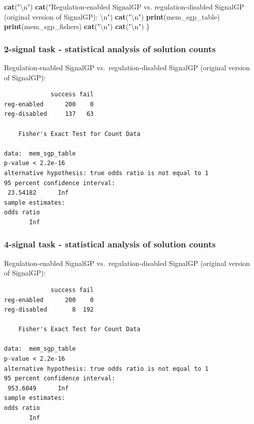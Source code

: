 \documentclass[
]{book}
\newenvironment{Shaded}{\begin{snugshade}}{\end{snugshade}}
\newcommand{\CharTok}[1]{\textcolor[rgb]{0.31,0.60,0.02}{#1}}
\newcommand{\KeywordTok}[1]{\textcolor[rgb]{0.13,0.29,0.53}{\textbf{#1}}}
\newcommand{\NormalTok}[1]{#1}
\newcommand{\StringTok}[1]{\textcolor[rgb]{0.31,0.60,0.02}{#1}}
\begin{document}
\begin{Shaded}
\begin{Highlighting}[]
  \KeywordTok{cat}\NormalTok{(}\StringTok{"}\CharTok{\textbackslash{}n}\StringTok{"}\NormalTok{)}
  \KeywordTok{cat}\NormalTok{(}\StringTok{"Regulation{-}enabled SignalGP vs. regulation{-}disabled SignalGP (original version of SignalGP):  }\CharTok{\textbackslash{}n}\StringTok{"}\NormalTok{)}
  \KeywordTok{cat}\NormalTok{(}\StringTok{"\textasciigrave{}\textasciigrave{}\textasciigrave{}}\CharTok{\textbackslash{}n}\StringTok{"}\NormalTok{)}
  \KeywordTok{print}\NormalTok{(mem\_sgp\_table)}
  \KeywordTok{print}\NormalTok{(mem\_sgp\_fishers)}
  \KeywordTok{cat}\NormalTok{(}\StringTok{"\textasciigrave{}\textasciigrave{}\textasciigrave{}}\CharTok{\textbackslash{}n}\StringTok{"}\NormalTok{)}
  \KeywordTok{cat}\NormalTok{(}\StringTok{"}\CharTok{\textbackslash{}n}\StringTok{"}\NormalTok{)}
\NormalTok{\}}
\end{Highlighting}
\end{Shaded}

\hypertarget{signal-task---statistical-analysis-of-solution-counts}{%
\subsubsection{2-signal task - statistical analysis of solution counts}\label{signal-task---statistical-analysis-of-solution-counts}}

Regulation-enabled SignalGP vs.~regulation-disabled SignalGP (original version of SignalGP):

\begin{verbatim}
             success fail
reg-enabled      200    0
reg-disabled     137   63

    Fisher's Exact Test for Count Data

data:  mem_sgp_table
p-value < 2.2e-16
alternative hypothesis: true odds ratio is not equal to 1
95 percent confidence interval:
 23.54182      Inf
sample estimates:
odds ratio 
       Inf 
\end{verbatim}

\hypertarget{signal-task---statistical-analysis-of-solution-counts-1}{%
\subsubsection{4-signal task - statistical analysis of solution counts}\label{signal-task---statistical-analysis-of-solution-counts-1}}

Regulation-enabled SignalGP vs.~regulation-disabled SignalGP (original version of SignalGP):

\begin{verbatim}
             success fail
reg-enabled      200    0
reg-disabled       8  192

    Fisher's Exact Test for Count Data

data:  mem_sgp_table
p-value < 2.2e-16
alternative hypothesis: true odds ratio is not equal to 1
95 percent confidence interval:
 953.6049      Inf
sample estimates:
odds ratio 
       Inf 
\end{verbatim}
\end{document}
